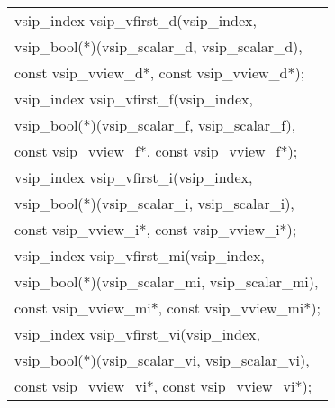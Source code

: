 \\\cvsiplh
\afh
{
\ttfamily
\\\hspace*{.04\textwidth}\begin{tabular}[H]{l}
vsip\_index vsip\_vfirst\_d(vsip\_index,\\*\hspace*{1cm}vsip\_bool(*)(vsip\_scalar\_d, vsip\_scalar\_d),\\*\hspace*{1cm}const vsip\_vview\_d*, const vsip\_vview\_d*);\\
vsip\_index vsip\_vfirst\_f(vsip\_index,\\*\hspace*{1cm}vsip\_bool(*)(vsip\_scalar\_f, vsip\_scalar\_f),\\*\hspace*{1cm}const vsip\_vview\_f*, const vsip\_vview\_f*);\\
vsip\_index vsip\_vfirst\_i(vsip\_index,\\*\hspace*{1cm}vsip\_bool(*)(vsip\_scalar\_i, vsip\_scalar\_i),\\*\hspace*{1cm}const vsip\_vview\_i*, const vsip\_vview\_i*);\\
vsip\_index vsip\_vfirst\_mi(vsip\_index,\\*\hspace*{1cm}vsip\_bool(*)(vsip\_scalar\_mi, vsip\_scalar\_mi),\\*\hspace*{1cm}const vsip\_vview\_mi*, const vsip\_vview\_mi*);\\
vsip\_index vsip\_vfirst\_vi(vsip\_index,\\*\hspace*{1cm}vsip\_bool(*)(vsip\_scalar\_vi, vsip\_scalar\_vi),\\*\hspace*{1cm}const vsip\_vview\_vi*, const vsip\_vview\_vi*);\\
\end{tabular}
}
\\\pyjvsiph
{}
